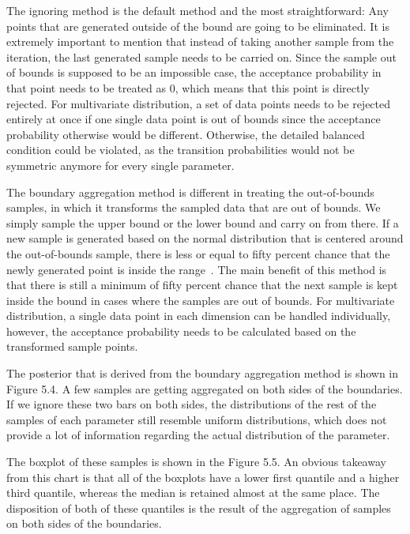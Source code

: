 The ignoring method is the default method and the most straightforward: Any points that are generated outside of the bound are going to be eliminated. It is extremely important to mention that instead of taking another sample from the iteration, the last generated sample needs to be carried on. Since the sample out of bounds is supposed to be an impossible case, the acceptance probability in that point needs to be treated as 0, which means that this point is directly rejected. For multivariate distribution, a set of data points needs to be rejected entirely at once if one single data point is out of bounds since the acceptance probability otherwise would be different. Otherwise, the detailed balanced condition could be violated, as the transition probabilities would not be symmetric anymore for every single parameter.

The boundary aggregation method is different in treating the out-of-bounds samples, in which it transforms the sampled data that are out of bounds. We simply sample the upper bound or the lower bound and carry on from there. If a new sample is generated based on the normal distribution that is centered around the out-of-bounds sample, there is less or equal to fifty percent chance that the newly generated point is inside the range~\cite{gaussian_distribution_property}. The main benefit of this method is that there is still a minimum of fifty percent chance that the next sample is kept inside the bound in cases where the samples are out of bounds. For multivariate distribution, a single data point in each dimension can be handled individually, however, the acceptance probability needs to be calculated based on the transformed sample points. 

The posterior that is derived from the boundary aggregation method is shown in Figure 5.4.  A few samples are getting aggregated on both sides of the boundaries. If we ignore these two bars on both sides, the distributions of the rest of the samples of each parameter still resemble uniform distributions, which does not provide a lot of information regarding the actual distribution of the parameter. 

The boxplot of these samples is shown in the Figure 5.5. An obvious takeaway from this chart is that all of the boxplots have a lower first quantile and a higher third quantile, whereas the median is retained almost at the same place. The disposition of both of these quantiles is the result of the aggregation of samples on both sides of the boundaries.



